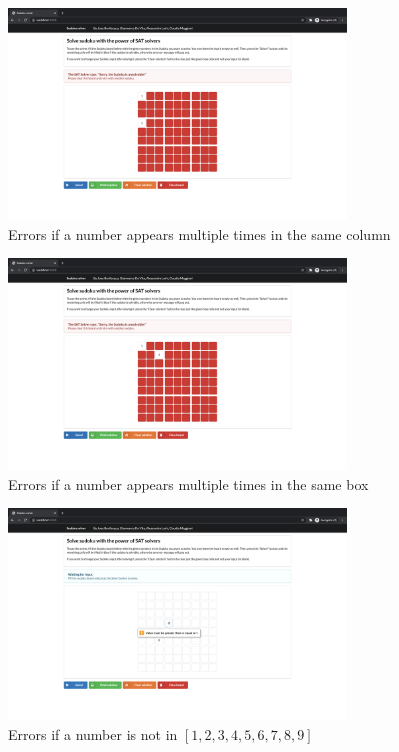 \documentclass[]{usiinfprospectus}
\newcounter{col}
\begin{document}
\begin{figure}[ht]
\centering
\includegraphics[width=0.8\textwidth]{pics/column_check.png}
\caption{Errors if a number appears multiple times in the same column}
\end{figure}

\begin{figure}[ht]
\centering
\includegraphics[width=0.8\textwidth]{pics/box_check.png}
\caption{Errors if a number appears multiple times in the same box}
\end{figure}

\begin{figure}[ht]
\centering
\includegraphics[width=0.8\textwidth]{pics/input_check.png}
\caption{Errors if a number is not in $ \left[ 1, 2,3,4,5,6,7,8, 9 \right] $}
\end{figure}
\end{document}
